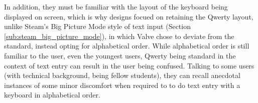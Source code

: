 \documentclass[requirements.tex]{subfiles}
\begin{document}
In addition, they must be familiar with the layout of the keyboard being
displayed on screen, which is why designs focued on retaining the Qwerty
layout, unlike Steam's Big Picture Mode style of text input (Section
\ref{sub:steam_big_picture_mode}), in which Valve chose to deviate from the 
standard, instead opting for alphabetical order. While alphabetical order is
still familiar to the user, even the youngest users, Qwerty being standard in
the context of text entry can result in the user being confused. Talking to
some users (with technical background, being fellow students), they can recall
anecdotal instances of some minor discomfort when required to to do text entry
with a keyboard in alphabetical order.
\end{document}
